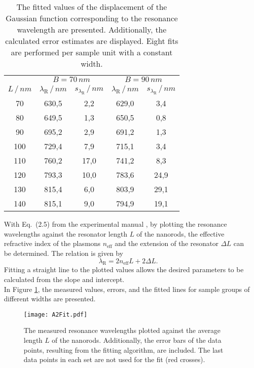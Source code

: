 \begin{table}[h!]
    \centering
    \caption{\label{tab:daten}The fitted values of the displacement of the Gaussian function 
    corresponding to the resonance wavelength are presented. 
    Additionally, the calculated error estimates are displayed. Eight fits are performed per 
    sample unit with a constant width.}
      \begin{tabular}{c|cc|cc}
            & \multicolumn{2}{c|}{\cellcolor[rgb]{ .608,  .761,  .902}$B = 70\,\si{nm}$} & \multicolumn{2}{c}{\cellcolor[rgb]{ .608,  .761,  .902}$B = 90\,\si{nm}$} \\
  \cmidrule{2-5}    \rowcolor[rgb]{ .867,  .922,  .969} $L\,/\,\si{nm}$ & $\lambda_{\text{R}}\,/\,\si{nm}$ & $s_{\lambda_{\text{R}}}\,/\,\si{nm}$ & $\lambda_{\text{R}}\,/\,\si{nm}$ & $s_{\lambda_{\text{R}}}\,/\,\si{nm}$ \\
      \midrule
      70    & 630,5 & 2,2   & 629,0 & 3,4 \\
      80    & 649,5 & 1,3   & 650,5 & 0,8 \\
      90    & 695,2 & 2,9   & 691,2 & 1,3 \\
      100   & 729,4 & 7,9   & 715,1 & 3,4 \\
      110   & 760,2 & 17,0  & 741,2 & 8,3 \\
      120   & 793,3 & 10,0  & 783,6 & 24,9 \\
      130   & 815,4 & 6,0   & 803,9 & 29,1 \\
      140   & 815,1 & 9,0   & 794,9 & 19,1 \\
      \end{tabular}
\end{table}\FloatBarrier
With Eq.~(2.5) from the experimental manual \cite{Anleitung}, 
by plotting the resonance wavelengths against the resonator length $L$ of the nanorods, 
the effective refractive index of the plasmons $n_{\text{eff}}$ and the extension of the 
resonator $\Delta{L}$ can be determined. The relation is given by
\begin{equation}
    \lambda_{\text{R}} = 2n_{\text{eff}}L + 2\Delta{L}.
\end{equation}
Fitting a straight line to the plotted values allows the desired parameters 
to be calculated from the slope and intercept. \\
In Figure \ref{fig:lin}, the measured values, errors, and the fitted lines for sample 
groups of different widths are presented.
\begin{figure}[h!]
    \centering
    \texttt{[image: A2Fit.pdf]}
    \caption{\label{fig:lin}The measured resonance wavelengths plotted against the average 
    length $L$ of the nanorods. 
    Additionally, the error bars of the data points, resulting from the fitting algorithm, 
    are included. The last data points in each set are not used for the fit (red crosses).}
\end{figure}\FloatBarrier
